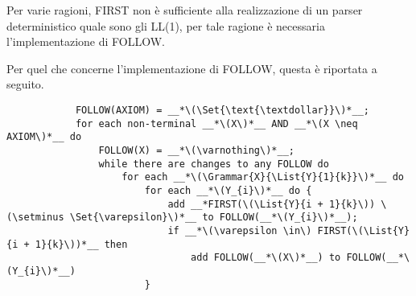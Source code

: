 \documentclass{subfiles}
\begin{document}
Per varie ragioni, FIRST non è sufficiente alla realizzazione di un parser deterministico quale sono gli LL(1),
per tale ragione è necessaria l'implementazione di FOLLOW.
\begin{Algorithm*}
    Per quel che concerne l'implementazione di FOLLOW, questa è riportata a seguito.
    \begin{center}
        \begin{lstlisting}
            FOLLOW(AXIOM) = __*\(\Set{\text{\textdollar}}\)*__;
            for each non-terminal __*\(X\)*__ AND __*\(X \neq AXIOM\)*__ do 
                FOLLOW(X) = __*\(\varnothing\)*__;
                while there are changes to any FOLLOW do 
                    for each __*\(\Grammar{X}{\List{Y}{1}{k}}\)*__ do 
                        for each __*\(Y_{i}\)*__ do {
                            add __*FIRST(\(\List{Y}{i + 1}{k}\)) \(\setminus \Set{\varepsilon}\)*__ to FOLLOW(__*\(Y_{i}\)*__);
                            if __*\(\varepsilon \in\) FIRST(\(\List{Y}{i + 1}{k}\))*__ then
                                add FOLLOW(__*\(X\)*__) to FOLLOW(__*\(Y_{i}\)*__)
                        }
        \end{lstlisting}
    \end{center}
\end{Algorithm*}
\end{document}
